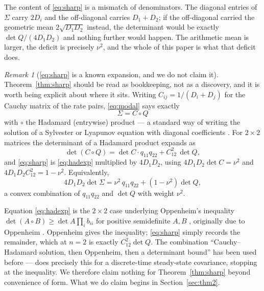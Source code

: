 \documentclass[11pt]{article}
\theoremstyle{plain}
\theoremstyle{definition}
\theoremstyle{remark}
\newtheorem{remark}[theorem]{Remark}
\newcommand{\Sig}{\Sigma}
\begin{document}
The content of \eqref{eq:sharp} is a mismatch of denominators. The diagonal entries of $\Sig$
carry $2D_i$ and the off-diagonal carries $D_1+D_2$; if the off-diagonal carried the geometric
mean $2\sqrt{D_1D_2}$ instead, the determinant would be exactly $\det Q/(4D_1D_2)$ and nothing
further would happen. The arithmetic mean is larger, the deficit is precisely $\nu^2$, and the
whole of this paper is what that deficit does.

\begin{remark}[\eqref{eq:sharp} is a known expansion, and we do not claim it]\label{rem:hadamard}
Theorem~\ref{thm:sharp} should be read as bookkeeping, not as a discovery, and it is worth being
explicit about where it sits. Writing $C_{ij}=1/(D_i+D_j)$ for the Cauchy matrix of the rate
pairs, \eqref{eq:modal} says exactly
\begin{equation}
  \Sig = C\circ Q \label{eq:hadamard}
\end{equation}
with $\circ$ the Hadamard (entrywise) product --- a standard way of writing the solution of a
Sylvester or Lyapunov equation with diagonal coefficients
\cite{PalittaLefteriu2022,YadykinEtAl2023}. For $2\times2$ matrices the determinant of a
Hadamard product expands as
\begin{equation}
  \det(C\circ Q) = \det C\cdot q_{11}q_{22} + C_{12}^2\,\det Q, \label{eq:hadexp}
\end{equation}
and \eqref{eq:sharp} is \eqref{eq:hadexp} multiplied by $4D_1D_2$, using
$4D_1D_2\det C=\nu^2$ and $4D_1D_2C_{12}^2=1-\nu^2$. Equivalently,
\begin{equation}
  4D_1D_2\det\Sig = \nu^2\,q_{11}q_{22} + (1-\nu^2)\det Q, \label{eq:convex}
\end{equation}
a convex combination of $q_{11}q_{22}$ and $\det Q$ with weight $\nu^2$.

Equation \eqref{eq:hadexp} is the $2\times2$ case underlying Oppenheim's inequality
$\det(A\circ B)\ge\det A\prod_ib_{ii}$ for positive semidefinite $A,B$
\cite[Thm.~7.8.16, eq.~(7.8.17), p.~509]{HornJohnson2012}, originally due to
Oppenheim \cite{Oppenheim1930}.
Oppenheim gives the inequality; \eqref{eq:sharp} simply records the remainder, which at $n=2$ is
exactly $C_{12}^2\det Q$. The combination ``Cauchy--Hadamard solution, then Oppenheim, then a
determinant bound'' has been used before --- \cite[\S4.5]{SchlickDemissie2011} does precisely
this for a discrete-time steady-state covariance, stopping at the inequality. We therefore claim
nothing for Theorem~\ref{thm:sharp} beyond convenience of form. What we do claim begins in
Section~\ref{sec:thm2}.
\end{remark}
\end{document}
